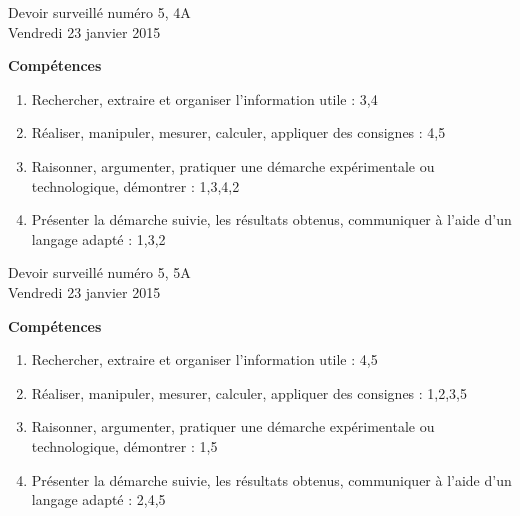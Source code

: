 \documentclass[a4paper,10pt]{article}
\begin{document}
\begin{feuilleDS}{Devoir surveillé numéro 5, 4A\\ \small Vendredi 23 janvier 2015}

\vspace{1cm}
{\bf Compétences}
\begin{enumerate}
    \item
        Rechercher, extraire et organiser l'information utile : 3,4
    \item
        Réaliser, manipuler, mesurer, calculer, appliquer des consignes : 4,5
    \item
        Raisonner, argumenter, pratiquer une démarche expérimentale ou technologique, démontrer : 1,3,4,2
    \item 
        Présenter la démarche suivie, les résultats obtenus, communiquer à l'aide d’un langage adapté : 1,3,2
\end{enumerate}
\end{feuilleDS}


\begin{feuilleDS}{Devoir surveillé numéro 5, 5A\\ \small Vendredi 23 janvier 2015}

\vspace{1cm}
{\bf Compétences}
\begin{enumerate}
    \item
        Rechercher, extraire et organiser l'information utile : 4,5
    \item
        Réaliser, manipuler, mesurer, calculer, appliquer des consignes : 1,2,3,5
    \item
        Raisonner, argumenter, pratiquer une démarche expérimentale ou technologique, démontrer : 1,5
    \item 
        Présenter la démarche suivie, les résultats obtenus, communiquer à l'aide d’un langage adapté : 2,4,5
\end{enumerate}


\end{feuilleDS}
\end{document}
